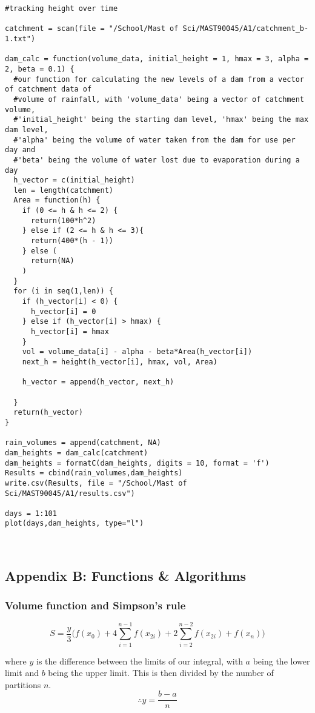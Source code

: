 \documentclass[a4paper, 11pt, oneside]{article}
\begin{document}
\begin{verbatim}
#tracking height over time

catchment = scan(file = "/School/Mast of Sci/MAST90045/A1/catchment_b-1.txt")

dam_calc = function(volume_data, initial_height = 1, hmax = 3, alpha = 2, beta = 0.1) {
  #our function for calculating the new levels of a dam from a vector of catchment data of
  #volume of rainfall, with 'volume_data' being a vector of catchment volume, 
  #'initial_height' being the starting dam level, 'hmax' being the max dam level,
  #'alpha' being the volume of water taken from the dam for use per day and
  #'beta' being the volume of water lost due to evaporation during a day
  h_vector = c(initial_height)
  len = length(catchment)
  Area = function(h) {
    if (0 <= h & h <= 2) {
      return(100*h^2)
    } else if (2 <= h & h <= 3){
      return(400*(h - 1))
    } else (
      return(NA)
    )
  }
  for (i in seq(1,len)) {
    if (h_vector[i] < 0) {
      h_vector[i] = 0
    } else if (h_vector[i] > hmax) {
      h_vector[i] = hmax
    } 
    vol = volume_data[i] - alpha - beta*Area(h_vector[i])  
    next_h = height(h_vector[i], hmax, vol, Area)
       
    h_vector = append(h_vector, next_h)
    
  } 
  return(h_vector)
}

rain_volumes = append(catchment, NA)
dam_heights = dam_calc(catchment)
dam_heights = formatC(dam_heights, digits = 10, format = 'f')
Results = cbind(rain_volumes,dam_heights)
write.csv(Results, file = "/School/Mast of Sci/MAST90045/A1/results.csv")

days = 1:101
plot(days,dam_heights, type="l")



\end{verbatim}

\newpage

\subsection{Appendix B: Functions \& Algorithms}

\subsubsection{Volume function and Simpson's rule}

$$S= \frac{y}{3}\bigg( f(x_0) + 4\sum_{i=1}^{n-1} f(x_{2i}) + 2\sum_{i=2}^{n-2} f(x_{2i}) + f(x_n) \bigg)$$

where $y$ is the difference between the limits of our integral, with $a$ being the lower limit and $b$ being the upper limit.  This is then divided by the number of partitions $n$.  $$\therefore y = \frac{b - a}{n}$$
\end{document}
